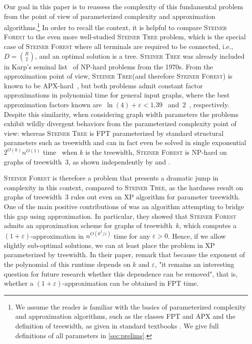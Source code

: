 \documentclass[a4paper]{article}
\let\oldcitet\citet
\renewcommand{\citet}[1]{\mbox{\oldcitet{#1}}}
\theoremstyle{plain}
\newcommand{\eps}{{\varepsilon}}
\newcommand{\hy}{\hbox{-}\nobreak\hskip0pt}
\newcommand{\pname}[1]{\textsc{#1}}
\newcommand{\SF}{\pname{Steiner Forest}\xspace}
\newcommand{\ST}{\pname{Steiner Tree}\xspace}
\begin{document}
Our goal in this paper is to reassess the complexity of this fundamental problem
from the point of view of parameterized complexity and approximation
algorithms.\footnote{We assume the reader is familiar with the
basics of parameterized complexity and approximation algorithms, such as the classes FPT and APX
and the definition of treewidth, as given in standard textbooks 
\cite{cygan2015parameterized,williamson2011design,feldmann2020survey}. 
We give full definitions of all parameters in \cref{sec:prelims}.}
In order to recall the context, it is helpful to compare \SF to the
even more well-studied \ST problem, which is the special case of \SF where all
terminals are required to be connected, i.e., $D=\binom{R}{2}$, and an optimal
solution is a tree. \ST was already included in Karp's seminal
list~\cite{karp1975computational} of NP-hard problems from the 1970s. From the
approximation point of view, \ST (and therefore \SF) is known to be
APX-hard~\cite{chlebik2008steiner}, but both problems admit constant factor
approximations in polynomial time for general input graphs, where the best
approximation factors known are~$\ln(4)+\eps<1.39$~\cite{byrka2013steiner}
and~$2$~\cite{agrawal1991trees, ravi1994primal}, respectively. Despite this
similarity, when considering graph width parameters the problems exhibit 
wildly divergent behaviors from the parameterized complexity point of
view: whereas \ST is FPT parameterized by standard structural parameters such
as treewidth and can in fact even be solved in single exponential
$2^{O(k)}n^{O(1)}$ time~\cite{bodlaender2015deterministic} when $k$ is the
treewidth, \SF is NP-hard on graphs of treewidth~$3$, as shown independently by
\citet{gassner2010steiner} and \citet{bateni2011approximation}.

\SF is therefore a problem that presents a dramatic jump in complexity in this
context, compared to \ST, as the hardness result on graphs of treewidth~$3$
rules out even an XP algorithm for parameter treewidth. One of the main
positive contributions of \citet{bateni2011approximation} was an algorithm
attempting to bridge this gap using approximation. In particular, they showed
that \SF admits an approximation scheme for graphs of treewidth~$k$, which
computes a $(1+\eps)$\hy{}approximation in $n^{O(k^2/\eps)}$ time for any $\eps>0$. Hence, if we
allow slightly sub-optimal solutions, we can at least place the problem in XP
parameterized by treewidth. In their paper, \citet{bateni2011approximation}
remark that because the exponent of the polynomial of this runtime depends on
$k$ and $\eps$, "it remains an interesting question for future research whether
this dependence can be removed", that is, whether a $(1+\eps)$-approximation
can be obtained in FPT time.
\end{document}
